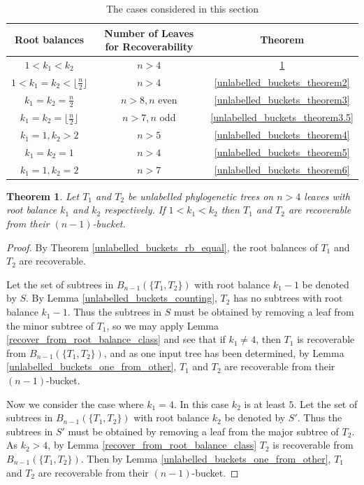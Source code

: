 \documentclass[12pt]{article}
\newtheorem{Theorem}{Theorem}[section]
\theoremstyle{definition}
\begin{document}
\begin{table}
    \centering
    \begin{tabular}{c c c}
\textbf{Root balances} & \textbf{Number of Leaves for Recoverability} & \textbf{Theorem}\\
\hline
$1 < k_1 < k_2$ & $n>4$ & \ref{unlabelled_buckets_theorem1} \\
$1 < k_1 = k_2 < \lfloor \frac{n}{2} \rfloor$ & $n>4$ & \ref{unlabelled_buckets_theorem2} \\
$k_1=k_2=\frac{n}{2} $ & $n>8, n$ even & \ref{unlabelled_buckets_theorem3}\\
$k_1 = k_2 = \lfloor \frac{n}{2} \rfloor$ & $n>7, n$ odd & \ref{unlabelled_buckets_theorem3.5}\\
$k_1=1,k_2>2$ & $n>5$ & \ref{unlabelled_buckets_theorem4}\\
$k_1=k_2=1$ & $n>4$ & \ref{unlabelled_buckets_theorem5}\\
$k_1=1,k_2=2$ & $n>7$ & \ref{unlabelled_buckets_theorem6}\\
\end{tabular}
\caption{The cases considered in this section}
\label{tab:unlabelled.cases}
\end{table}

\begin{Theorem}\label{unlabelled_buckets_theorem1}
    Let $T_1$ and $T_2$ be unlabelled phylogenetic trees on $n>4$ leaves with root balance $k_1$ and $k_2$ respectively. If $1 < k_1 < k_2$ then $T_1$ and $T_2$ are recoverable from their $(n-1)$-bucket.
\end{Theorem}

\begin{proof}
    By Theorem \ref{unlabelled_buckets_rb_equal}, the root balances of $T_1$ and $T_2$ are recoverable. 
    
    Let the set of subtrees in $B_{n-1}(\{T_1, T_2\})$ with root balance $k_1-1$ be denoted by $S$. By Lemma \ref{unlabelled_buckets_counting}, $T_2$ has no subtrees with root balance $k_1-1$. Thus the subtrees in $S$ must be obtained by removing a leaf from the minor subtree of $T_1$, so we may apply Lemma \ref{recover_from_root_balance_class} and see that if $k_1 \neq 4$, then $T_1$ is recoverable from $B_{n-1}(\{T_1, T_2\})$, and as one input tree has been determined, by Lemma \ref{unlabelled_buckets_one_from_other}, $T_1$ and $T_2$ are recoverable from their $(n-1)$-bucket.
    
    Now we consider the case where $k_1=4$. In this case $k_2$ is at least $5$. Let the set of subtrees in $B_{n-1}(\{T_1, T_2\})$ with root balance $k_2$ be denoted by $S'$. Thus the subtrees in $S'$ must be obtained by removing a leaf from the major subtree of $T_2$. As $k_2 > 4$, by Lemma \ref{recover_from_root_balance_class} $T_2$ is recoverable from $B_{n-1}(\{T_1, T_2\})$. Then by Lemma \ref{unlabelled_buckets_one_from_other}, $T_1$ and $T_2$ are recoverable from their $(n-1)$-bucket.
    
\end{proof}
\end{document}
